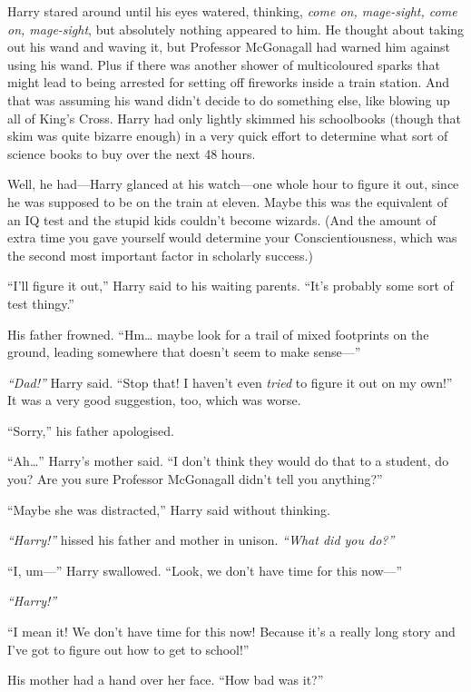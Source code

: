 Harry stared around until his eyes watered, thinking, \emph{come on,
mage-sight, come on, mage-sight}, but absolutely nothing appeared to
him. He thought about taking out his wand and waving it, but Professor
McGonagall had warned him against using his wand. Plus if there was
another shower of multicoloured sparks that might lead to being arrested
for setting off fireworks inside a train station. And that was assuming
his wand didn't decide to do something else, like blowing up all of
King's Cross. Harry had only lightly skimmed his schoolbooks (though
that skim was quite bizarre enough) in a very quick effort to determine
what sort of science books to buy over the next 48 hours.

Well, he had---Harry glanced at his watch---one whole hour to figure it
out, since he was supposed to be on the train at eleven. Maybe this was
the equivalent of an IQ test and the stupid kids couldn't become
wizards. (And the amount of extra time you gave yourself would determine
your Conscientiousness, which was the second most important factor in
scholarly success.)

``I'll figure it out,'' Harry said to his waiting parents. ``It's
probably some sort of test thingy.''

His father frowned. ``Hm\ldots{} maybe look for a trail of mixed
footprints on the ground, leading somewhere that doesn't seem to make
sense---''

\emph{``Dad!''} Harry said. ``Stop that! I haven't even \emph{tried} to
figure it out on my own!'' It was a very good suggestion, too, which was
worse.

``Sorry,'' his father apologised.

``Ah\ldots{}'' Harry's mother said. ``I don't think they would do that
to a student, do you? Are you sure Professor McGonagall didn't tell you
anything?''

``Maybe she was distracted,'' Harry said without thinking.

\emph{``Harry!''} hissed his father and mother in unison. \emph{``What
did you do?''}

``I, um---'' Harry swallowed. ``Look, we don't have time for this
now---''

\emph{``Harry!''}

``I mean it! We don't have time for this now! Because it's a really long
story and I've got to figure out how to get to school!''

His mother had a hand over her face. ``How bad was it?''

